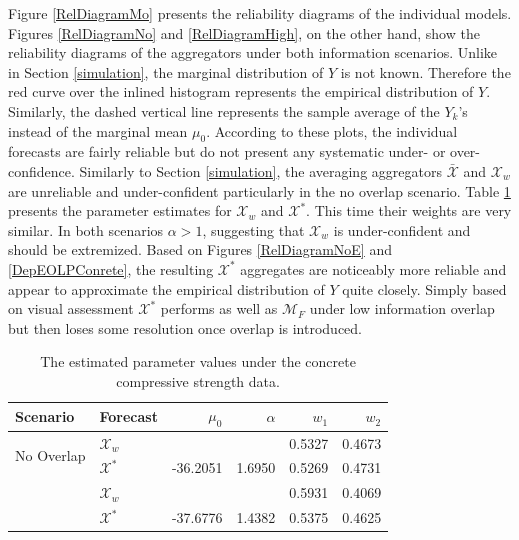 \documentclass[11pt]{article}
\theoremstyle{definition}
\theoremstyle{definition}
\begin{document}
Figure \ref{RelDiagramMo} presents the reliability diagrams of the individual models. Figures \ref{RelDiagramNo} and \ref{RelDiagramHigh}, on the other hand, show the reliability diagrams of the aggregators under both information scenarios. Unlike in Section \ref{simulation}, the marginal distribution of $Y$ is not known. Therefore the red curve over the inlined histogram represents the empirical distribution of $Y$. Similarly, the dashed vertical line represents the sample average of the $Y_k$'s instead of the marginal mean $\mu_0$. According to these plots, the individual forecasts are fairly reliable but do not present any systematic under- or over-confidence. Similarly to Section \ref{simulation}, the averaging aggregators $\bar{\mathcal{X}}$ and $\mathcal{X}_w$ are  unreliable and under-confident particularly in the no overlap scenario. Table \ref{NoParamsReal} presents the parameter estimates for $\mathcal{X}_w$ and $\mathcal{X}^*$.  This time their weights are very similar. 
In both scenarios $\alpha > 1$, suggesting that $\mathcal{X}_w$ is under-confident and should be extremized. Based on Figures \ref{RelDiagramNoE} and  \ref{DepEOLPConrete}, the resulting $\mathcal{X}^*$ aggregates are noticeably more reliable and appear to approximate the empirical distribution of $Y$ quite closely. Simply based on visual assessment $\mathcal{X}^*$ performs as well as $\mathcal{M}_F$ under low information overlap but then loses some resolution once  overlap is introduced. 

\begin{table}[ht]
\centering
\caption{The estimated parameter values 
under the concrete compressive strength data. }
\begin{tabular}{llrrrr}
   \hline \hline
Scenario & Forecast & $\mu_0$ & $\alpha$ & $w_1$ & $w_2$\\
  \hline
\multirow{2}{*}{No Overlap} & $\mathcal{X}_w$ &  &  & 0.5327 & 0.4673 \\ 
&  $\mathcal{X}^*$ & -36.2051 & 1.6950 & 0.5269 & 0.4731 \\  \rule{0pt}{2.9ex} 
\multirow{2}{*}{High Overlap}  & $\mathcal{X}_w$ &  &  & 0.5931 & 0.4069 \\ 
 & $\mathcal{X}^*$ & -37.6776 & 1.4382 & 0.5375 & 0.4625 \\ 
   \hline
\end{tabular}
\label{NoParamsReal}
\end{table}
\end{document}
